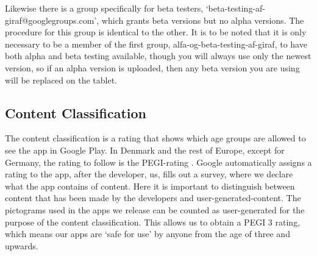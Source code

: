 Likewise there is a group specifically for beta testers, ‘beta-testing-af-giraf@googlegroups.com’, which grants beta versions but no alpha versions. The procedure for this group is identical to the other.
It is to be noted that it is only necessary to be a member of the first group, alfa-og-beta-testing-af-giraf, to have both alpha and beta testing available, though you will always use only the newest version, so if an alpha version is uploaded, then any beta version you are using will be replaced on the tablet.

\subsection{Content Classification} \label{Sprint4_SecContentClassification}
The content classification is a rating that shows which age groups are allowed to see the app in Google Play. In Denmark and the rest of Europe, except for Germany, the rating to follow is the PEGI-rating \citep{PEGI}. Google automatically assigns a rating to the app, after the developer, us, fills out a survey, where we declare what the app contains of content. Here it is important to distinguish between content that has been made by the developers and user-generated-content. The pictograms used in the apps we release can be counted as user-generated for the purpose of the content classification. This allows us to obtain a PEGI 3 rating, which means our apps are ‘safe for use’ by anyone from the age of three and upwards.